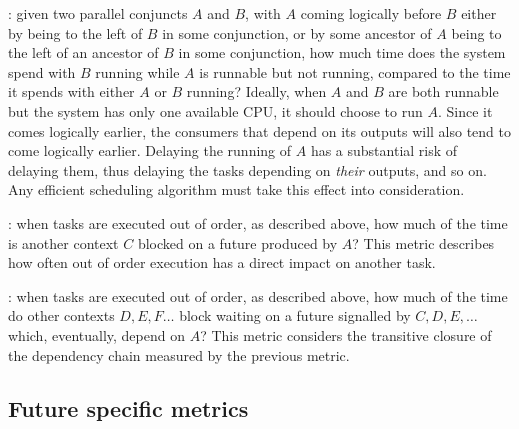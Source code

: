 :
given two parallel conjuncts $A$ and $B$,
with $A$ coming logically before $B$
either by being to the left of $B$ in some conjunction,
or by some ancestor of $A$ being to the left of an ancestor of $B$
in some conjunction,
how much time does the system spend with $B$ running
while $A$ is runnable but not running,
compared to the time it spends with either $A$ or $B$ running?
Ideally, when $A$ and $B$ are both runnable
but the system has only one available CPU,
it should choose to run $A$.
Since it comes logically earlier,
the consumers that depend on its outputs
will also tend to come logically earlier.
Delaying the running of $A$ has a substantial risk of delaying them,
thus delaying the tasks depending on \emph{their} outputs, and so on.
Any efficient scheduling algorithm
must take this effect into consideration.

:
when tasks are executed out of order, as described above,
how much of the time is another context $C$
blocked on a future produced by $A$?
This metric describes how often
out of order execution has a direct impact on another task.

:
when tasks are executed out of order, as described above,
how much of the time do other contexts $D, E, F\ldots$ block
waiting on a future signalled by $C, D, E, \ldots$
which, eventually, depend on $A$?
This metric considers the transitive closure of the dependency chain
measured by the previous metric.


\subsection{Future specific metrics}





